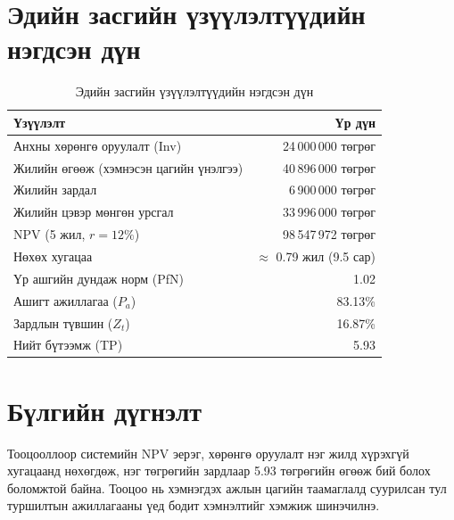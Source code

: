 \section{Эдийн засгийн үзүүлэлтүүдийн нэгдсэн дүн}
\begin{table}[H]
\centering
\caption{Эдийн засгийн үзүүлэлтүүдийн нэгдсэн дүн}
\label{table:econ}
\begin{tabular}{|p{8cm}|r|}
\hline
\textbf{Үзүүлэлт} & \textbf{Үр дүн} \\ \hline
Анхны хөрөнгө оруулалт (Inv) & 24\,000\,000 төгрөг \\ \hline
Жилийн өгөөж (хэмнэсэн цагийн үнэлгээ) & 40\,896\,000 төгрөг \\ \hline
Жилийн зардал & 6\,900\,000 төгрөг \\ \hline
Жилийн цэвэр мөнгөн урсгал & 33\,996\,000 төгрөг \\ \hline
NPV (5 жил, $r = 12\%$) & 98\,547\,972 төгрөг \\ \hline
Нөхөх хугацаа & $\approx$ 0.79 жил (9.5 сар) \\ \hline
Үр ашгийн дундаж норм (PfN) & 1.02 \\ \hline
Ашигт ажиллагаа ($P_a$) & 83.13\% \\ \hline
Зардлын түвшин ($Z_t$) & 16.87\% \\ \hline
Нийт бүтээмж (TP) & 5.93 \\ \hline
\end{tabular}
\end{table}

\section*{Бүлгийн дүгнэлт}
Тооцооллоор системийн NPV эерэг, хөрөнгө оруулалт нэг жилд хүрэхгүй хугацаанд нөхөгдөж, нэг төгрөгийн зардлаар 5.93 төгрөгийн өгөөж бий болох боломжтой байна. Тооцоо нь хэмнэгдэх ажлын цагийн таамаглалд суурилсан тул туршилтын ажиллагааны үед бодит хэмнэлтийг хэмжиж шинэчилнэ.
